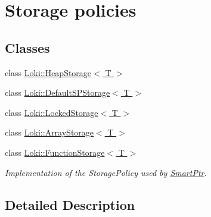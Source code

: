 \hypertarget{group__SmartPointerStorageGroup}{}\section{Storage policies}
\label{group__SmartPointerStorageGroup}
\subsection*{Classes}
\begin{DoxyCompactItemize}
\item 
class \hyperlink{classLoki_1_1HeapStorage}{Loki\+::\+Heap\+Storage$<$ T $>$}
\item 
class \hyperlink{classLoki_1_1DefaultSPStorage}{Loki\+::\+Default\+S\+P\+Storage$<$ T $>$}
\item 
class \hyperlink{classLoki_1_1LockedStorage}{Loki\+::\+Locked\+Storage$<$ T $>$}
\item 
class \hyperlink{classLoki_1_1ArrayStorage}{Loki\+::\+Array\+Storage$<$ T $>$}
\item 
class \hyperlink{classLoki_1_1FunctionStorage}{Loki\+::\+Function\+Storage$<$ T $>$}
\begin{DoxyCompactList}\small\item\em Implementation of the Storage\+Policy used by \hyperlink{classLoki_1_1SmartPtr}{Smart\+Ptr}. \end{DoxyCompactList}\end{DoxyCompactItemize}


\subsection{Detailed Description}

